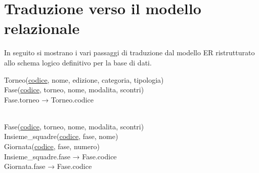 \documentclass[11pt, openany]{article}
\theoremstyle{definition}
\theoremstyle{plain}
\theoremstyle{remark}
\begin{document}
		\section{Traduzione verso il modello relazionale}
			In seguito si mostrano i vari passaggi di traduzione dal modello ER ristrutturato allo schema logico definitivo per la base di dati.
			
			\vspace{.3cm}	
			\begin{minipage}[t]{8.5cm}
			\end{minipage}
			\begin{minipage}[b]{9cm}
				\begin{flushright}
					Torneo(\underline{codice}, nome, edizione, categoria, tipologia)\\
					Fase(\underline{codice}, torneo, nome, modalita, scontri)\\
					Fase.torneo → Torneo.codice
					\vspace{2cm}
				\end{flushright}
			\end{minipage}
			
			\vspace{.3cm}
			\centering	
			\\\vspace{.2cm}
			Fase(\underline{codice}, torneo, nome, modalita, scontri)\\
			Insieme\_squadre(\underline{codice}, fase, nome)\\
			Giornata(\underline{codice}, fase, numero)\\
			Insieme\_squadre.fase → Fase.codice\\
			Giornata.fase → Fase.codice
\end{document}
